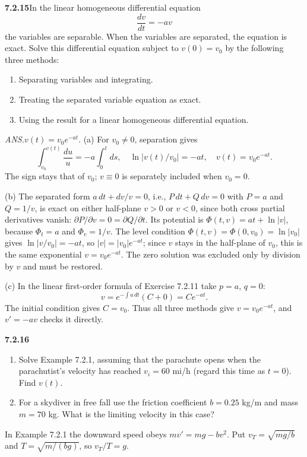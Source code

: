 \par\bigskip
\noindent\textbf{7.2.15}\quad In the linear homogeneous differential equation
\[
\frac{dv}{dt}=-av
\]
the variables are separable. When the variables are separated, the equation is
exact. Solve this differential equation subject to $v(0)=v_{0}$ by the
following three methods:
\begin{enumerate}
\item[(a)] Separating variables and integrating.
\item[(b)] Treating the separated variable equation as exact.
\item[(c)] Using the result for a linear homogeneous differential equation.
\end{enumerate}
\par\nobreak\hfill\emph{ANS.}\enspace $v(t)=v_{0}e^{-at}$.
\solution
(a) For $v_0\ne0$, separation gives
\[
\int_{v_0}^{v(t)}\frac{du}{u}=-a\int_0^t ds,
\quad \ln|v(t)/v_0|=-at,
\quad v(t)=v_0e^{-at}.
\]
The sign stays that of $v_0$; $v\equiv0$ is separately included when
$v_0=0$.

(b) The separated form $a\,dt+dv/v=0$, i.e., $P\,dt+Q\,dv=0$ with
$P=a$ and $Q=1/v$, is exact on either half-plane $v>0$ or $v<0$, since
both cross partial derivatives vanish: $\partial P/\partial v=0
=\partial Q/\partial t$. Its potential is $\Phi(t,v)=at+\ln|v|$, because
$\Phi_t=a$ and $\Phi_v=1/v$. The level condition
$\Phi(t,v)=\Phi(0,v_0)=\ln|v_0|$ gives $\ln|v/v_0|=-at$, so
$|v|=|v_0|e^{-at}$; since $v$ stays in the half-plane of $v_0$, this is
the same exponential $v=v_0e^{-at}$.
The zero solution was excluded only by division by $v$ and must be restored.

(c) In the linear first-order formula of Exercise 7.2.11 take $p=a$,
$q=0$:
\[
v=e^{-\int a\,dt}(C+0)=Ce^{-at}.
\]
The initial condition gives $C=v_0$. Thus all three methods give
$\boxed{v=v_0e^{-at}}$, and $v'=-av$ checks it directly.

\par\bigskip
\noindent\textbf{7.2.16}\quad
\begin{enumerate}
\item[(a)] Solve Example 7.2.1, assuming that the parachute opens when the
  parachutist's velocity has reached $v_{i}=60$ mi/h (regard this time as
  $t=0$). Find $v(t)$.
\item[(b)] For a skydiver in free fall use the friction coefficient
  $b=0.25$ kg/m and mass $m=70$ kg. What is the limiting velocity in this
  case?
\end{enumerate}
\solution
In Example 7.2.1 the downward speed obeys
$mv'=mg-bv^2$. Put $v_T=\sqrt{mg/b}$ and
$T=\sqrt{m/(bg)}$, so $v_T/T=g$.


